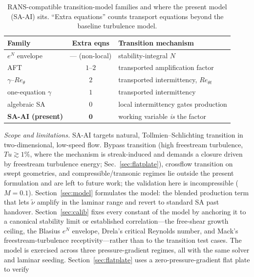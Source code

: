 \documentclass[journal]{new-aiaa}
\begin{document}
\begin{table}[t]
  \centering
  \caption{RANS-compatible transition-model families and where the present model
  (SA-AI) sits. ``Extra equations'' counts transport equations beyond the baseline
  turbulence model.}
  \label{tab:taxonomy}
  \begin{tabular}{lcl}
    \toprule
    Family & Extra eqns & Transition mechanism \\
    \midrule
    $e^N$ envelope \cite{smith_gamberoni_1956, drela_giles_1987} & --- (non-local) & stability-integral $N$ \\
    AFT \cite{coder_maughmer_2014, halila_2022} & $1$--$2$ & transported amplification factor \\
    $\gamma$--$Re_\theta$ \cite{langtry_menter_2009, medida_baeder_2011} & $2$ & transported intermittency, $Re_{\theta t}$ \\
    one-equation $\gamma$ \cite{menter_gamma_2015} & $1$ & transported intermittency \\
    algebraic SA \cite{cakmakcioglu_2018, rahman_2024} & $0$ & local intermittency gates production \\
    \textbf{SA-AI (present)} & $\mathbf{0}$ & working variable \emph{is} the factor \\
    \bottomrule
  \end{tabular}
\end{table}
\emph{Scope and limitations.} SA-AI targets natural, Tollmien--Schlichting
transition in two-dimensional, low-speed flow. Bypass transition (high freestream
turbulence, $Tu\!\gtrsim\!1\%$, where the mechanism is streak-induced and demands a
closure driven by freestream turbulence energy; Sec.~\ref{sec:flatplate}),
crossflow transition on swept geometries, and compressible/transonic regimes lie
outside the present formulation and are left to future work; the validation here is
incompressible ($M\!=\!0.1$).
Section~\ref{sec:model} formulates the model: the blended production term that
lets $\tilde\nu$ amplify in the laminar range and revert to standard SA past
handover. Section~\ref{sec:calib} fixes every constant of the model by anchoring
it to a canonical stability limit or established correlation---the free-shear
growth ceiling, the Blasius $e^N$ envelope, Drela's critical Reynolds number, and
Mack's freestream-turbulence receptivity---rather than to the transition test
cases.
The model is exercised across three pressure-gradient regimes, all with the same
solver and laminar seeding.
Section~\ref{sec:flatplate} uses a zero-pressure-gradient flat plate to verify
\end{document}
